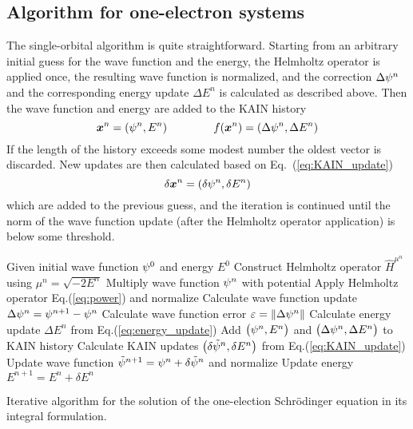 \subsection{Algorithm for one-electron systems}
The single-orbital algorithm is quite straightforward. Starting from an arbitrary initial
guess for the wave function and the energy, the Helmholtz operator is applied once, the 
resulting wave function is normalized, and the correction $\Delta\psi^n$ and the 
corresponding energy update $\Delta E^n$ is calculated as described above. Then the wave function
and energy are added to the KAIN history
\begin{equation}
    \boldsymbol x^n = \left(\psi^n,E^n\right)\qquad \qquad
    f(\boldsymbol x^n) = \left(\Delta\psi^n,\Delta E^n\right)
\end{equation}
If the length of the history exceeds some modest number the oldest vector is discarded. 
New updates are then calculated based on Eq.~(\ref{eq:KAIN_update})
\begin{equation}
    \delta \boldsymbol x^n = \left(\delta\psi^n, \delta E^n\right)
\end{equation}
which are added to the previous guess, and the iteration is continued until the norm of the
wave function update (after the Helmholtz operator application) is below some threshold.
\begin{algorithm}
\begin{algorithmic}[1]
\STATE Given initial wave function $\psi^0$ and energy $E^0$
    \STATE Construct Helmholtz operator $\hat{H}^{\mu^n}$ using $\mu^n = \sqrt{-2E^n}$
    \STATE Multiply wave function $\psi^n$ with potential
    \STATE Apply Helmholtz operator Eq.(\ref{eq:power}) and normalize
    \STATE Calculate wave function update $\Delta\psi^n = \psi^{n+1}-\psi^n$
    \STATE Calculate wave function error $\varepsilon = \|\Delta\psi^n\|$ 
    \STATE Calculate energy update $\Delta{E}^n$ from Eq.(\ref{eq:energy_update})
    \STATE Add $\big(\psi^n, E^n\big)$ and $\big(\Delta\psi^n,\Delta E^n\big)$
	    to KAIN history
    \STATE Calculate KAIN updates $\big(\delta\tilde{\psi}^n,\delta{E}^n\big)$ from 
	    Eq.(\ref{eq:KAIN_update}) 
    \STATE Update wave function 
	    $\tilde{\psi}^{n+1} = \psi^n + \delta\tilde{\psi}^n$
	    and normalize
    \STATE Update energy $E^{n+1} = E^n+\delta{E}^n$
\ENDWHILE
\label{alg:one-electron}
\caption{Iterative algorithm for the solution of the one-election Schr\"{o}dinger equation
    in its integral formulation.} 
\end{algorithmic}
\end{algorithm}

